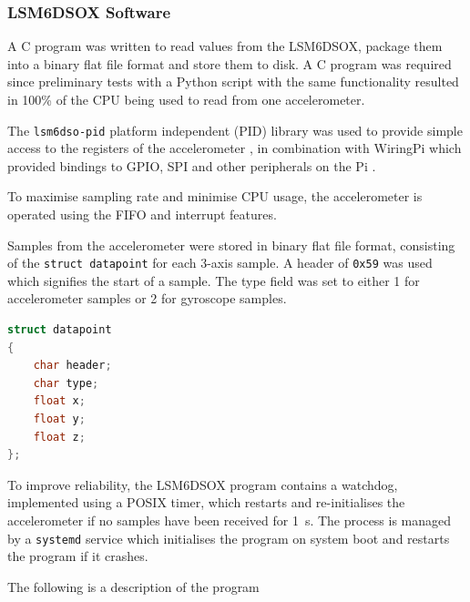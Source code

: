 \documentclass{report}
\begin{document}
\subsubsection{LSM6\-DSOX Software}
A C program was written to read values from the LSM6\-DSOX, package them into a binary flat file format and store them to disk. A C program was required since preliminary tests with a Python script with the same functionality resulted in 100\% of the CPU being used to read from one accelerometer.

The \texttt{lsm6dso-pid} platform independent (PID) library was used to provide simple access to the registers of the accelerometer \cite{stmicroelectronics_lsm6dsox_pid}, in combination with WiringPi which provided bindings to GPIO, SPI and other peripherals on the Pi \cite{wiringpi-github}.

To maximise sampling rate and minimise CPU usage, the accelerometer is operated using the FIFO and interrupt features.

Samples from the accelerometer were stored in binary flat file format, consisting of the \texttt{struct datapoint} for each 3-axis sample. A header of \texttt{0x59} was used which signifies the start of a sample. The type field was set to either 1 for accelerometer samples or 2 for gyroscope samples.

\begin{lstlisting}[language=C]
struct datapoint
{
    char header;
    char type;
    float x;
    float y;
    float z;
};
\end{lstlisting}

To improve reliability, the LSM6\-DSOX program contains a watchdog, implemented using a POSIX timer, which restarts and re-initialises the accelerometer if no samples have been received for \SI{1}{\second}. The process is managed by a \texttt{systemd} service which initialises the program on system boot and restarts the program if it crashes.

The following is a description of the program
\end{document}
